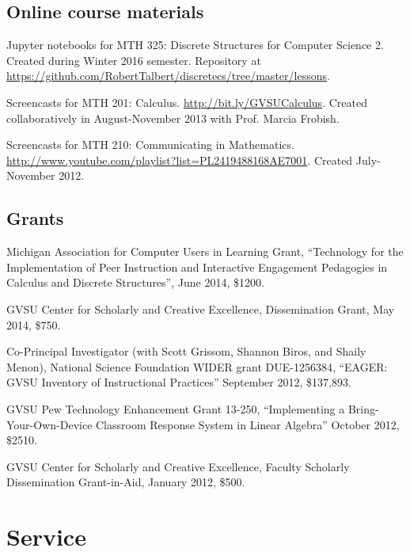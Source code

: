 \documentclass[letterpaper]{article}
\renewenvironment{itemize}{
  \begin{list}{}{
    \setlength{\leftmargin}{1.5em}
	\setlength{\itemsep}{0in}
  }
}{
  \end{list}
}
\begin{document}
\subsection*{Online course materials}
\begin{itemize}
	\item Jupyter notebooks for MTH 325: Discrete Structures for Computer Science 2. Created during Winter 2016 semester. Repository at \url{https://github.com/RobertTalbert/discretecs/tree/master/lessons}.
	\item Screencasts for MTH 201: Calculus. \url{http://bit.ly/GVSUCalculus}. Created collaboratively in August-November 2013 with Prof. Marcia Frobish. 
	\item Screencasts for MTH 210: Communicating in Mathematics. \url{http://www.youtube.com/playlist?list=PL2419488168AE7001}. Created July-November 2012. 
\end{itemize}


\subsection*{Grants}
\begin{itemize}
	\item Michigan Association for Computer Users in Learning Grant, ``Technology for the Implementation of Peer Instruction and Interactive Engagement Pedagogies in Calculus and Discrete Structures'', June 2014, \$1200. 
	\item GVSU Center for Scholarly and Creative Excellence, Dissemination Grant, May 2014, \$750. 
	\item Co-Principal Investigator (with Scott Grissom, Shannon Biros, and Shaily Menon), National Science Foundation WIDER grant DUE-1256384, ``EAGER: GVSU Inventory of Instructional Practices'' September 2012, \$137,893.  
	\item GVSU Pew Technology Enhancement Grant 13-250, ``Implementing a Bring-Your-Own-Device Classroom Response System in Linear Algebra'' October 2012, \$2510. 
	\item GVSU Center for Scholarly and Creative Excellence, Faculty Scholarly Dissemination Grant-in-Aid, January 2012, \$500. 
\end{itemize}






\section*{Service}
\end{document}
